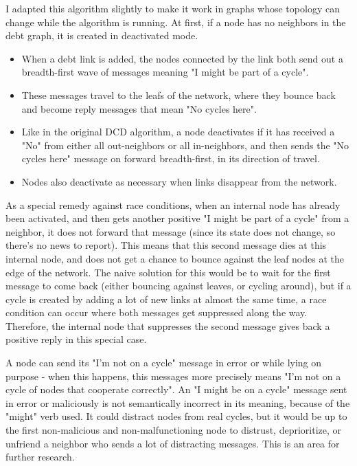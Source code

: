 \documentclass[11pt,twoside,a4paper]{article}
\begin{document}
I adapted this algorithm slightly to make it work in graphs whose topology can change while the algorithm is running. At first, if a node has no neighbors in the debt graph, it is created in deactivated mode.

\begin{itemize}
\item When a debt link is added, the nodes connected by the link both send out a breadth-first wave of messages meaning "I might be part of a cycle".
\item These messages travel to the leafs of the net\-work, where they bounce back and be\-come re\-ply mes\-sa\-ges that mean "No cy\-cles here".
\item Like in the original DCD algorithm, a node deactivates if it has received a "No" from either all out-neighbors or all in-neighbors, and then sends the "No cycles here" message on forward breadth-first, in its direction of travel.
\item Nodes also deactivate as necessary when links disappear from the network.
\end{itemize}

As a special remedy against race conditions, when an internal node has already been activated, and then gets another positive "I might be part of a cycle" from a neighbor, it does not forward that message (since its state does not change, so there's no news to report). This means that this second message dies at this internal node, and does not get a chance to bounce against the leaf nodes at the edge of the network. The naive solution for this would be to wait for the first message to come back (either bouncing against leaves, or cycling around), but if a cycle is created by adding a lot of new links at almost the same time, a race condition can occur where both messages get suppressed along the way. Therefore, the internal node that suppresses the second message gives back a positive reply in this special case.

A node can send its "I'm not on a cycle" message in error or while lying on purpose - when this happens, this messages more precisely means "I'm not on a cycle of nodes that cooperate correctly". An "I might be on a cycle" message sent in error or maliciously is not semantically incorrect in its meaning, because of the "might" verb used. It could distract nodes from real cycles, but it would be up to the first non-malicious and non-malfunctioning node to distrust, deprioritize, or unfriend a neighbor who sends a lot of distracting messages. This is an area for further research.
\end{document}
